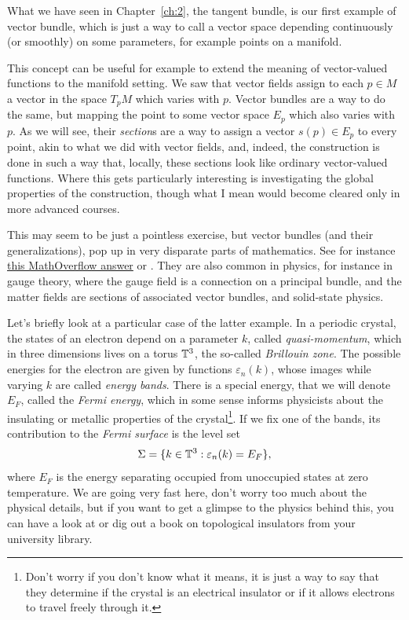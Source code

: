 What we have seen in Chapter~\ref{ch:2}, the tangent bundle, is our first example of vector bundle, which is just a way to call a vector space depending continuously (or smoothly) on some parameters, for example points on a manifold.

This concept can be useful for example to extend the meaning of vector-valued functions to the manifold setting.
We saw that vector fields assign to each $p\in M$ a vector in the space $T_pM$ which varies with $p$. Vector bundles are a way to do the same, but mapping the point to some vector space $E_p$ which also varies with $p$.
As we will see, their \emph{section}s are a way to assign a vector $s(p)\in E_p$ to every point, akin to what we did with vector fields, and, indeed, the construction is done in such a way that, locally, these sections look like ordinary vector-valued functions.
Where this gets particularly interesting is investigating the global properties of the construction, though what I mean would become cleared only in more advanced courses.

This may seem to be just a pointless exercise, but vector bundles (and their generalizations), pop up in very disparate parts of mathematics. See for instance \href{https://mathoverflow.net/questions/7836/why-is-it-useful-to-study-vector-bundles}{this MathOverflow answer} or \cite{Zakharevich2019Attitudes}. They are also common in physics, for instance in gauge theory, where the gauge field is a connection on a principal bundle, and the matter fields are sections of associated vector bundles, and solid-state physics.

Let's briefly look at a particular case of the latter example. In a periodic crystal, the states of an electron depend on a parameter $k$, called \emph{quasi-momentum}, which in three dimensions lives on a torus $\mathbb{T}^3$, the so-called \emph{Brillouin zone}.
The possible energies for the electron are given by functions $\varepsilon_n(k)$, whose images while varying $k$ are called \emph{energy bands}.
There is a special energy, that we will denote $E_F$, called the \emph{Fermi energy}, which in some sense informs physicists about the insulating or metallic properties of the crystal\footnote{Don't worry if you don't know what it means, it is just a way to say that they determine if the crystal is an electrical insulator or if it allows electrons to travel freely through it.}.
If we fix one of the bands, its contribution to the \emph{Fermi surface} is the level set
\begin{equation}
	\Sigma = \{k\in\mathbb{T}^3 : \varepsilon_n(k)=E_F\},
\end{equation}
where $E_F$ is the energy separating occupied from unoccupied states at zero temperature.
We are going very fast here, don't worry too much about the physical details, but if you want to get a glimpse to the physics behind this, you can have a look at \cite{Dugdale_2016} or dig out a book on topological insulators from your university library.

